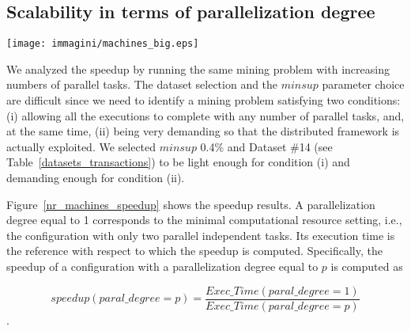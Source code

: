 \subsection{Scalability in terms of parallelization degree}
\label{nr_machines}



\begin{figure*}[!t]
\begin{center}
\texttt{[image: immagini/machines\_big.eps]}
\caption{Speedup with different parallelization degrees (Dataset \#14,
 $minsup$~0.4\%)}
\label{nr_machines_speedup}
\end{center}
\end{figure*}



We analyzed the speedup by running the same mining problem with increasing numbers of parallel tasks.
The dataset selection and the $minsup$ parameter choice are difficult 
since we need to identify a mining problem satisfying two conditions:
(i) allowing all the executions to complete with any number of parallel tasks, 
and, at the same time, 
(ii) being very demanding so that the distributed framework is actually exploited. 
We selected $minsup$ 0.4\% and Dataset \#14 (see Table~\ref{datasets_transactions}) 
to be light enough for condition (i) and demanding enough for condition (ii).

Figure~\ref{nr_machines_speedup} shows the speedup results. 
A parallelization degree equal to 1 corresponds to the minimal computational resource setting, i.e., the configuration with only two parallel independent tasks.
Its execution time is the reference with respect to which the speedup is computed. 
Specifically, the speedup of a configuration with a parallelization degree equal to $p$ is computed as 

$$speedup(paral\_degree=p)=\frac{Exec\_Time(paral\_degree=1)}{Exec\_Time(paral\_degree=p)}$$. 


